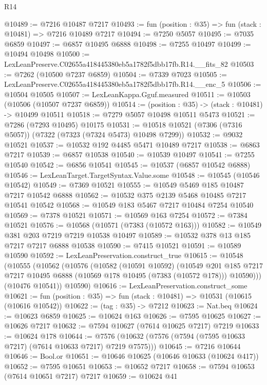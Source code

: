 \begin{lexlean}{R14}
\begin{coremodule}
@10489 := @7216 @10487 @7217
@10493 := fun (position : @35) => fun (stack : @10481) => @7216 @10489 @7217
@10494 := @7250 @5057
@10495 := @7035 @6859
@10497 := @6857 @10495 @6888
@10498 := @7255 @10497
@10499 := @10494 @10498
@10500 := LexLeanPreserve.C02655a418445380eb5a1782f5dbb17fb.R14.__fits_82
@10503 := @7262 (@10500 @7237 @6859)
@10504 := @7339 @7023
@10505 := LexLeanPreserve.C02655a418445380eb5a1782f5dbb17fb.R14.__enc_5
@10506 := @10504 @10505
@10507 := LexLeanKappa.Gguf.measured
@10511 := @10503 (@10506 (@10507 @7237 @6859))
@10514 := (position : @35) -> (stack : @10481) -> @10499 @10511
@10518 := @7279 @5057 @10498 @10511 @5473
@10521 := @7286 (@7293 @10495) @10175
@10531 := @10518 @10521 (@7306 (@7316 @5057)) (@7322 (@7323 (@7324 @5473) @10498 @7299))
@10532 := @9032 @10521
@10537 := @10532 @192 @4485 @5471 @10489 @7217
@10538 := @6863 @7217
@10539 := @6857 @10538
@10540 := @10539 @10497
@10541 := @7255 @10540
@10542 := @6856 @10541
@10545 := @10537 (@6857 @10542 @6888)
@10546 := LexLeanTarget.TargetSyntax.Value.some
@10548 := @10545 (@10546 @10542)
@10549 := @7369 @10521
@10555 := @10549 @5469 @185 @10487 @7217 @10542 @6888
@10562 := @10532 @375 @2139 @5468 @10485 @7217 @10541 @10542
@10568 := @10549 @183 @5467 @7217 @10484 @7254 @10540
@10569 := @7378 @10521
@10571 := @10569 @163 @7254
@10572 := @7384 @10521
@10576 := @10568 (@10571 (@7383 (@10572 @163)))
@10582 := @10549 @381 @203 @7219 @7219 @10538 @10497
@10589 := @10532 @378 @13 @185 @7217 @7217 @6888 @10538
@10590 := @7415 @10521
@10591 := @10589 @10590
@10592 := LexLeanPreservation.construct_true
@10615 := @10548
    (@10555
      (@10562
        (@10576
          (@10582
            (@10591 @10592)
            (@10549
              @201
              @185
              @7217
              @7217
              @10495
              @6888
              (@10569 @178 @10495 (@7383 (@10572 @178)))
              @10590)))
        (@10476 @10541))
      @10590)
@10616 := LexLeanPreservation.construct_some
@10621 := fun (position : @35) => fun (stack : @10481) => @10531 (@10615 (@10616 @10542))
@10622 := (tag : @35) -> @7212
@10623 := Nat.beq
@10624 := @10623 @6859
@10625 := @10624 @163
@10626 := @7595 @10625
@10627 := @10626 @7217
@10632 := @7594 @10627 (@7614 @10625 @7217) @7219
@10633 := @10624 @178
@10644 := @7576 (@10632 (@7576 (@7594 (@7595 @10633 @7217) (@7614 @10633 @7217) @7219 @7575)))
@10645 := @7216 @10644
@10646 := Bool.or
@10651 := @10646 @10625 (@10646 @10633 (@10624 @417))
@10652 := @7595 @10651
@10653 := @10652 @7217
@10658 := @7594 @10653 (@7614 @10651 @7217) @7217
@10659 := @10624 @41

\end{coremodule}
\end{lexlean}
